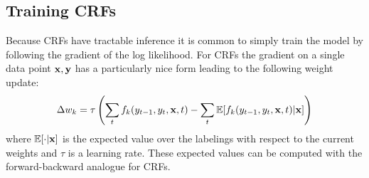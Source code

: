 \subsection{Training CRFs}

Because CRFs have tractable inference it is common to simply train the model by following the gradient of the log likelihood. For CRFs the gradient on a single data point $\mathbf{x}, \mathbf{y}$ has a particularly nice form leading to the following weight update:
\begin{align*}
\Delta w_k = \tau \left(\sum_{t} f_k(y_{t-1}, y_{t}, \mathbf{x}, t) - \sum_{t} \mathbb{E} [f_k(y_{t-1}, y_{t}, \mathbf{x}, t) | \mathbf{x}]\right)
\end{align*}
where $\mathbb{E} [ \cdot | \mathbf{x}]$ is the expected value over the labelings with respect to the current weights and $\tau$ is a learning rate. These expected values can be computed with the forward-backward analogue for CRFs. 

